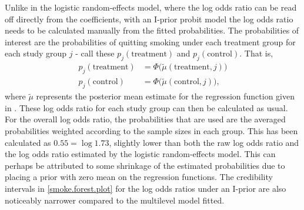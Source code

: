 \documentclass[a4paper,showframe,11pt]{report}\usepackage[]{graphicx}\usepackage[]{color}
\begin{document}
Unlike in the logistic random-effects model, where the log odds ratio can be read off directly from the coefficients, with an I-prior probit model the log odds ratio needs to be calculated manually from the fitted probabilities.
The probabilities of interest are the probabilities of quitting smoking under each treatment group for each study group $j$ - call these $p_j(\text{treatment})$ and $p_j(\text{control})$.
That is,
\begin{align*}
  p_j(\text{treatment}) &= \Phi\big( \tilde\mu(\text{treatment}, j) \big) \\
  p_j(\text{control})   &= \Phi\big( \tilde\mu(\text{control}, j) \big),
\end{align*}
where $\tilde \mu$ represents the posterior mean estimate for the regression function given in .
These log odds ratio for each study group can then be calculated as usual.
For the overall log odds ratio, the probabilities that are used are the averaged probabilities weighted according to the sample sizes in each group.
This has been calculated as $0.55 = \log 1.73$, slightly lower than both the raw log odds ratio and the log odds ratio estimated by the logistic random-effects model.
This can perhaps be attributed to some shrinkage of the estimated probabilities due to placing a prior with zero mean on the regression functions.
The credibility intervals in \cref{smoke.forest.plot} for the log odds ratios under an I-prior are also noticeably narrower compared to the multilevel model fitted.
\end{document}
